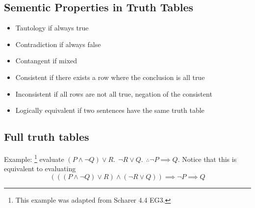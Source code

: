 \documentclass[11pt]{article}
\begin{document}
\subsection{Sementic Properties in Truth Tables}
\begin{itemize}
    \item Tautology if always true
    \item Contradiction if always false 
    \item Contangent if mixed
    \item Consistent if there exists a row where the conclusion is all true
    \item Inconsistent if all rows are not all true, negation of the consistent
    \item Logically equivalent if two sentences have the same truth table
\end{itemize}



\subsection{Full truth tables}
Example: \footnote{This example was adapted from Scharer 4.4 EG3.}
evaluate $(P\land \neg Q)\vee R. ~~\neg R\vee Q. ~~\therefore \neg P\implies Q$. 
Notice that this is equivalent to evaluating
\begin{equation*}
    \left(\left(\left(P\land \neg Q\right)\vee R \right) \land 
    \left(\neg R\vee Q\right)\right) \implies \neg P\implies Q
\end{equation*}
\end{document}
